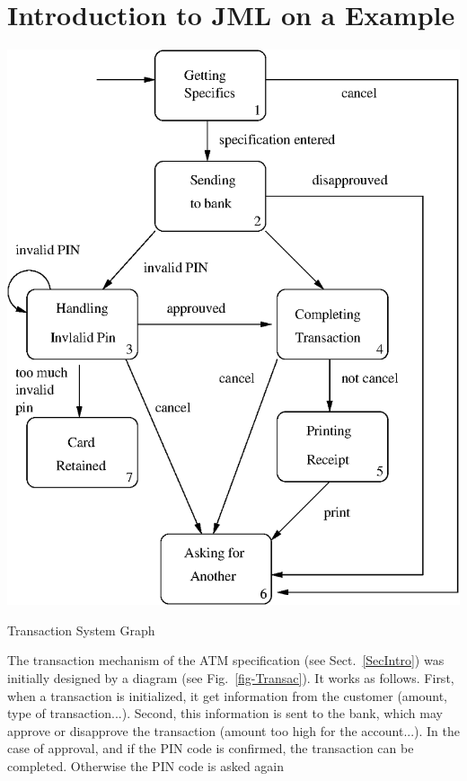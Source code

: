 \section{Introduction to JML on a Example}
\label{sec-RunningExample}


\begin{floatingfigure}[l]{6cm}
\begin{center}
\includegraphics[scale=0.4]{Transac.eps}
\end{center}
\caption{Transaction System Graph}
\label{fig-Transac}
\end{floatingfigure}
The transaction mechanism of 
the ATM specification (see Sect.~\ref{SecIntro}) 
was initially designed by a 
 diagram (see Fig.~\ref{fig-Transac}). It works as follows.
First, when a transaction is initialized, it get information
from the customer (amount, type of transaction...). Second,
this information is sent to the bank, which may approve 
or disapprove the transaction (amount too high for the account...).
In the case of approval, and if the PIN code is confirmed, the
transaction can be completed. Otherwise the PIN code is asked again
